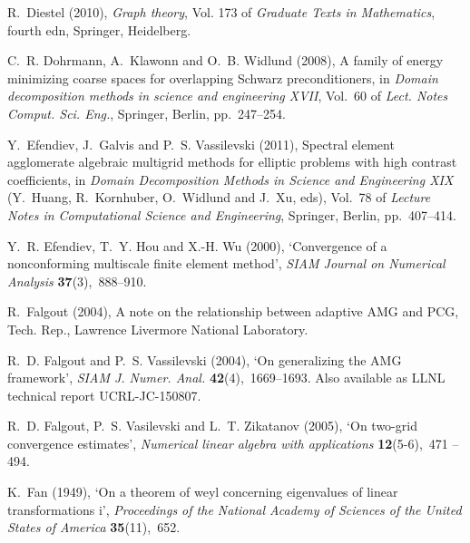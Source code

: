 \documentclass[12pt]{acta_2011xz}
\begin{document}
\begin{thebibliography}{xx}
R.~Diestel  (2010), {\em Graph theory}, Vol. 173 of {\em Graduate Texts in
  Mathematics}, fourth edn, Springer, Heidelberg.

C.~R. Dohrmann, A.~Klawonn and O.~B. Widlund  (2008), A family of energy
  minimizing coarse spaces for overlapping {S}chwarz preconditioners, in {\em
  Domain decomposition methods in science and engineering {XVII}}, Vol.~60 of
  {\em Lect. Notes Comput. Sci. Eng.}, Springer, Berlin, pp.~247--254.

Y.~Efendiev, J.~Galvis and P.~S. Vassilevski  (2011), Spectral element
  agglomerate algebraic multigrid methods for elliptic problems with high
  contrast coefficients, in {\em {D}omain {D}ecomposition {M}ethods in
  {S}cience and {E}ngineering {XIX}} (Y.~Huang, R.~Kornhuber, O.~Widlund and
  J.~Xu, eds), Vol.~78 of {\em Lecture Notes in Computational Science and
  Engineering}, Springer, Berlin, pp.~407--414.

Y.~R. Efendiev, T.~Y. Hou and X.-H. Wu  (2000), `Convergence of a nonconforming
  multiscale finite element method', {\em SIAM Journal on Numerical Analysis}
  {\bf 37}(3),~888--910.

R.~Falgout  (2004), A note on the relationship between adaptive {AMG} and
  {PCG}, {T}ech. {R}ep., Lawrence Livermore National Laboratory.

R.~D. Falgout and P.~S. Vassilevski  (2004), `On generalizing the {AMG}
  framework', {\em SIAM J. Numer. Anal.} {\bf 42}(4),~1669--1693.
\newblock Also available as LLNL technical report UCRL-JC-150807.

R.~D. Falgout, P.~S. Vasilevski and L.~T. Zikatanov  (2005), `On two-grid
  convergence estimates', {\em Numerical linear algebra with applications} {\bf
  12}(5-6),~471 -- 494.

K.~Fan  (1949), `On a theorem of weyl concerning eigenvalues of linear
  transformations i', {\em Proceedings of the National Academy of Sciences of
  the United States of America} {\bf 35}(11),~652.


\end{thebibliography}
\end{document}
